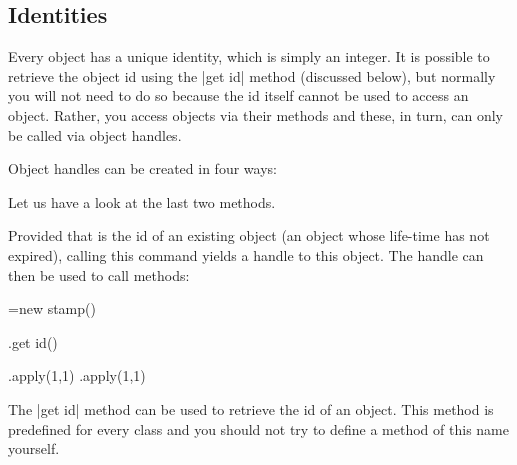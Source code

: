 \subsection{Identities}
\label{section-identities}

Every object has a unique identity, which is simply an integer. It is
possible to retrieve the object id using the |get id| method (discussed
below), but normally you will not need to do so because the id itself
cannot be used to access an object. Rather, you access objects via
their methods and these, in turn, can only be called via object
handles. 

Object handles can be created in four ways:

Let us have a look at the last two methods.

\begin{command}{\pgfooobj{}}
  Provided that  is the id of an existing object (an object
  whose life-time has not expired), calling this command yields a
  handle to this object. The handle can then be used to call methods:
\begin{codeexample}
\pgfoonew \mystamp=new stamp()

\mystamp.get id(\myid)

\mystamp.apply(1,1)
\pgfooobj{\myid}.apply(1,1)
\end{codeexample}
\end{command}

The |get id| method can be used to retrieve the id of an object. This
method is predefined for every class and you should not try to define
a method of this name yourself.

